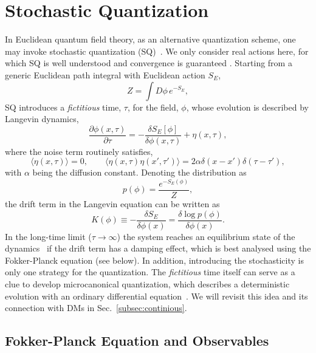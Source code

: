 \section{Stochastic Quantization}
\label{sec:sq}

In Euclidean quantum field theory, as an alternative quantization scheme, one may invoke stochastic quantization (SQ)~\cite{Parisi:1980ys}. We only consider real actions here, for which SQ is well understood and convergence is guaranteed \cite{Damgaard:1987rr}. Starting from a generic Euclidean path integral with Euclidean action $S_E$,
\begin{equation}
    Z = \int D\phi \, e^{-S_E},
\end{equation}
SQ introduces a \textit{fictitious} time, $\tau$, for the field, $\phi$, whose evolution is described by Langevin dynamics,
\begin{equation}
    \frac{\partial \phi(x,\tau)}{\partial \tau} = - \frac{\delta S_E[\phi]}{\delta \phi(x,\tau)} + \eta(x,\tau),
    \label{eq:sq}
\end{equation}
where the noise term routinely satisfies,
\begin{equation}
    \langle \eta(x,\tau) \rangle = 0,\qquad \langle \eta(x,\tau)\eta(x',\tau') \rangle = 2\alpha\delta(x-x')\delta(\tau - \tau'),
\end{equation}
with $\alpha$ being the diffusion constant. Denoting the distribution as
\begin{equation}
    p(\phi) = \frac{e^{-S_E(\phi)}}{Z},
\end{equation}
the drift term in the Langevin equation can be written as
\begin{equation}
\label{eq:K}
    K(\phi)  \equiv  - \frac{\delta S_E}{\delta \phi(x)} = \frac{\delta \log p(\phi)}{\delta \phi(x)}.
\end{equation}
In the long-time limit ($\tau\rightarrow \infty$) the system reaches an equilibrium state of the dynamics~\cite{Namiki:1993fd} if the drift term has a damping effect, which is best analysed using the Fokker-Planck equation (see below). In addition, introducing the stochasticity is only one strategy for the quantization. The \textit{fictitious} time itself can serve as a clue to develop microcanonical quantization, which describes a deterministic evolution with an ordinary differential equation~\cite{Callaway:1982eb}. We will revisit this idea and its connection with DMs in Sec.~\ref{subsec:continious}.

\subsection{Fokker-Planck Equation and Observables}

